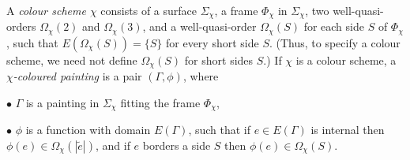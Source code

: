 A \textit{colour scheme $\chi$} consists of a surface $\Sigma_\chi$, a frame $\Phi_\chi$ in $\Sigma_\chi$, two well-quasi-orders $\Omega_\chi(2)$ and $\Omega_\chi(3)$, and a well-quasi-order $\Omega_\chi(S)$ for each side $S$ of $\Phi_\chi$, such that $E(\Omega_\chi(S))=\{S\}$ for every short side $S$. (Thus, to specify a colour scheme, we need not define $\Omega_\chi(S)$ for short sides $S$.) If $\chi$ is a colour scheme, a \textit{$\chi$-coloured painting} is a pair $(\Gamma,\phi)$, where

\hspace*{12pt}$\bullet$ $\Gamma$ is a painting in $\Sigma_\chi$ fitting the frame $\Phi_\chi$,

\hspace*{12pt}$\bullet$ $\phi$ is a function with domain $E(\Gamma)$, such that if $e\in E(\Gamma)$ is internal then $\phi(e)\in \Omega_\chi(|\tilde{e}|)$, and if $e$ borders a side $S$ then $\phi(e)\in \Omega_\chi(S)$.
